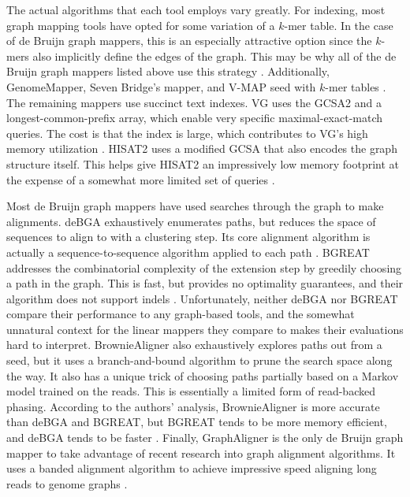 The actual algorithms that each tool employs vary greatly. 
For indexing, most graph mapping tools have opted for some variation of a $k$-mer table. 
In the case of de Bruijn graph mappers, this is an especially attractive option since the $k$-mers also implicitly define the edges of the graph. 
This may be why all of the de Bruijn graph mappers listed above use this strategy \cite{Holley_2012, Limasset_2016, Liu_2016, Heydari_2018, Rautiainen_2019b}. 
Additionally, GenomeMapper, Seven Bridge's mapper, and V-MAP seed with $k$-mer tables \cite{Schneeberger_2009, Rakocevic_2019, Vaddadi_2019}. 
The remaining mappers use succinct text indexes.
VG uses the GCSA2 \cite{Siren_2017} and a longest-common-prefix array, which enable very specific maximal-exact-match queries.
The cost is that the index is large, which contributes to VG's high memory utilization \cite{Garrison_2019}.
HISAT2 uses a modified GCSA \cite{Siren_2014}  that also encodes the graph structure itself.
This helps give HISAT2 an impressively low memory footprint at the expense of a somewhat more limited set of queries \cite{Kim_2019}.

Most de Bruijn graph mappers have used searches through the graph to make alignments.
deBGA exhaustively enumerates paths, but reduces the space of sequences to align to with a clustering step.
Its core alignment algorithm is actually a sequence-to-sequence algorithm applied to each path \cite{Liu_2016}.
BGREAT addresses the combinatorial complexity of the extension step by greedily choosing a path in the graph.
This is fast, but provides no optimality guarantees, and their algorithm does not support indels \cite{Limasset_2016}.
Unfortunately, neither deBGA nor BGREAT compare their performance to any graph-based tools, and the somewhat unnatural context for the linear mappers they compare to makes their evaluations hard to interpret.
BrownieAligner also exhaustively explores paths out from a seed, but it uses a branch-and-bound algorithm to prune the search space along the way.
It also has a unique trick of choosing paths partially based on a Markov model trained on the reads.
This is essentially a limited form of read-backed phasing.
According to the authors' analysis, BrownieAligner is more accurate than deBGA and BGREAT, but BGREAT tends to be more memory efficient, and deBGA tends to be faster \cite{Heydari_2018}.
Finally, GraphAligner is the only de Bruijn graph mapper to take advantage of recent research into graph alignment algorithms.
It uses a banded alignment algorithm to achieve impressive speed aligning long reads to genome graphs \cite{Rautiainen_2019b}.

